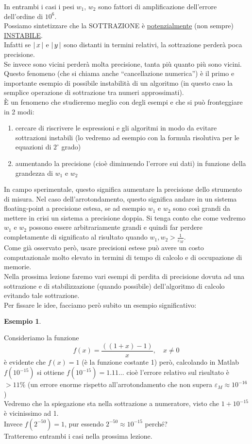 \documentclass[12pt]{article}
\newtheorem*{esempio}{Esempio}
\DeclarePairedDelimiter{\abs}{\lvert}{\rvert}
\begin{document}
In entrambi i casi i pesi $w_1$, $w_2$ sono fattori di amplificazione dell'errore dell'ordine di $10^6$.\\
Possiamo sintetizzare che la SOTTRAZIONE è \uline{potenzialmente} (non sempre) \uline{INSTABILE}.\\
Infatti se $\abs{\,x\,}$ e $\abs{\,y\,}$ sono distanti in termini relativi, la sottrazione perderà poca precisione.\\
Se invece sono vicini perderà molta precisione, tanta più quanto più sono vicini.\\
Questo fenomeno (che si chiama anche “cancellazione numerica”) è il primo e importante esempio di possibile instabilità di un algoritmo (in questo caso la semplice operazione di sottrazione tra numeri approssimati).\\
È un fenomeno che studieremo meglio con degli esempi e che si può fronteggiare in 2 modi:
\begin{enumerate}
    \item cercare di riscrivere le espressioni e gli algoritmi in modo da evitare sottrazioni instabili (lo vedremo ad esempio con la formula risolutiva per le equazioni di $2^\circ$ grado)
    \item aumentando la precisione (cioè diminuendo l’errore sui dati) in funzione della grandezza di $w_1$ e $w_2$
\end{enumerate}
In campo sperimentale, questo significa aumentare la precisione dello strumento di misura. Nel caso dell'arrotondamento, questo significa andare in un sistema floating-point a precisione estesa, se ad esempio $w_1$ e $w_2$ sono così grandi da mettere in crisi un sistema a precisione doppia. Si tenga conto che come vedremo $w_1$ e $w_2$ possono essere arbitrariamente grandi e quindi far perdere completamente di significato al risultato quando $w_1, w_2 > \frac{1}{\varepsilon_M}$.\\
Come già osservato però, usare precisioni estese può avere un costo computazionale molto elevato in termini di tempo di calcolo e di occupazione di memorie.\\
Nella prossima lezione faremo vari esempi di perdita di precisione dovuta ad una sottrazione e di stabilizzazione (quando possibile) dell'algoritmo di calcolo evitando tale sottrazione.\\
Per fissare le idee, facciamo però subito un esempio significativo: 
\begin{esempio}\end{esempio}
Consideriamo la funzione
\[f(x) = \frac{((1 + x) - 1)}{x}, \quad x \ne 0\]
è evidente che $f(x) = 1$ (è la funzione costante 1) però, calcolando in Matlab $f(10^{-15})$ si ottiene $f(10^{-15}) = 1.11\dotsc$ cioè l’errore relativo sul risultato è $>11\%$ (un errore enorme rispetto all'arrotondamento che non supera $\varepsilon_M \approx 10^{-16}$)\\
Vedremo che la spiegazione sta nella sottrazione a numeratore, visto che $1+10^{-15}$ è vicinissimo ad 1.\\
Invece $f(2^{-50}) = 1$, pur essendo $2^{-50} \approx 10^{-15}$ perché?\\
Tratteremo entrambi i casi nella prossima lezione.
\end{document}
